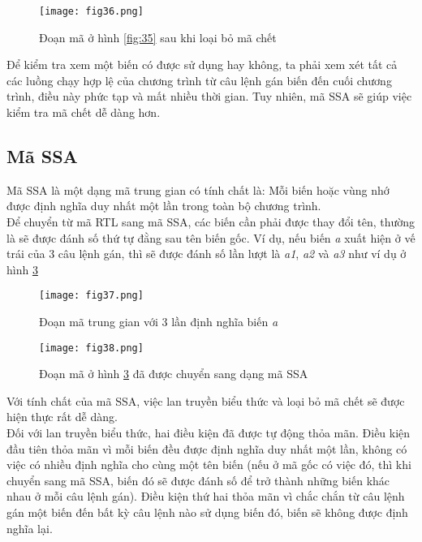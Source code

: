 \begin{figure}[h]
	\centering
	\texttt{[image: fig36.png]}
	\caption{Đoạn mã ở hình \ref{fig:35} sau khi loại bỏ mã chết}
	\label{fig:36}
\end{figure}

Để kiểm tra xem một biến có được sử dụng hay không, ta phải xem xét tất cả các luồng chạy hợp lệ của chương trình từ câu lệnh gán biến đến cuối chương trình, điều này phức tạp và mất nhiều thời gian. Tuy nhiên, mã SSA sẽ giúp việc kiểm tra mã chết dễ dàng hơn.
\subsection{Mã SSA} \label{ssa}

Mã SSA là một dạng mã trung gian có tính chất là: Mỗi biến hoặc vùng nhớ được định nghĩa duy nhất một lần trong toàn bộ chương trình. \\

Để chuyển từ mã RTL sang mã SSA, các biến cần phải được thay đổi tên, thường là sẽ được đánh số thứ tự đằng sau tên biến gốc. Ví dụ, nếu biến \textit{a} xuất hiện ở vế trái của 3 câu lệnh gán, thì sẽ được đánh số lần lượt là \textit{a1}, \textit{a2} và \textit{a3} như ví dụ ở hình \ref{fig:38}

\begin{figure}[h]
	\centering
	\texttt{[image: fig37.png]}
	\caption{Đoạn mã trung gian với 3 lần định nghĩa biến \textit{a}}
	\label{fig:37}
\end{figure}

\begin{figure}[h]
	\centering
	\texttt{[image: fig38.png]}
	\caption{Đoạn mã ở hình \ref{fig:38} đã được chuyển sang dạng mã SSA}
	\label{fig:38}
\end{figure}

Với tính chất của mã SSA, việc lan truyền biểu thức và loại bỏ mã chết sẽ được hiện thực rất dễ dàng.\\

Đối với lan truyền biểu thức, hai điều kiện đã được tự động thỏa mãn. Điều kiện đầu tiên thỏa mãn vì mỗi biến đều được định nghĩa duy nhất một lần, không có việc có nhiều định nghĩa cho cùng một tên biến (nếu ở mã gốc có việc đó, thì khi chuyển sang mã SSA, biến đó sẽ được đánh số để trở thành những biến khác nhau ở mỗi câu lệnh gán). Điều kiện thứ hai thỏa mãn vì chắc chắn từ câu lệnh gán một biến đến bất kỳ câu lệnh nào sử dụng biến đó, biến sẽ không được định nghĩa lại.\\

